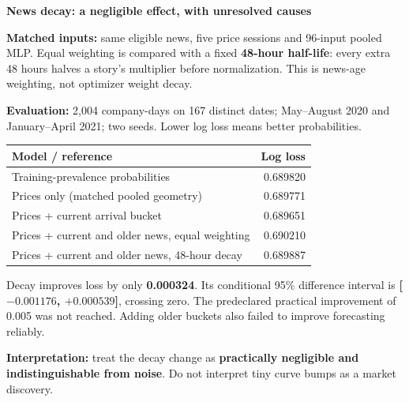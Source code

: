 \documentclass[10pt,a4paper,landscape]{article}
\newcommand{\heading}[1]{{\fontsize{23}{27}\selectfont\bfseries\color{navy}#1}\par}
\newcommand{\sub}[1]{\vspace{3pt}{\large\bfseries\color{navy}#1}\par}
\begin{document}
\newpage
\heading{News decay: a negligible effect, with unresolved causes}
\begin{minipage}[t]{.48\linewidth}
\sub{4 / Completed temporal tests}
\textbf{Matched inputs:} same eligible news, five price sessions and 96-input pooled MLP. Equal weighting is compared with a fixed \textbf{48-hour half-life}: every extra 48 hours halves a story's multiplier before normalization. This is news-age weighting, not optimizer weight decay.

\textbf{Evaluation:} 2,004 company-days on 167 distinct dates; May--August 2020 and January--April 2021; two seeds. Lower log loss means better probabilities.

\begin{tabularx}{\linewidth}{@{}Yr@{}}
\toprule
\textbf{Model / reference} & \textbf{Log loss}\\\midrule
Training-prevalence probabilities & 0.689820\\
Prices only (matched pooled geometry) & 0.689771\\
Prices + current arrival bucket & 0.689651\\
Prices + current and older news, equal weighting & 0.690210\\
Prices + current and older news, 48-hour decay & 0.689887\\\bottomrule
\end{tabularx}

Decay improves loss by only \textbf{0.000324}. Its conditional 95\% difference interval is \textbf{[$-0.001176$, $+0.000539$]}, crossing zero. The predeclared practical improvement of 0.005 was not reached. Adding older buckets also failed to improve forecasting reliably.

\textbf{Interpretation:} treat the decay change as \textbf{practically negligible and indistinguishable from noise}. Do not interpret tiny curve bumps as a market discovery.
\end{minipage}\hfill
\end{document}
